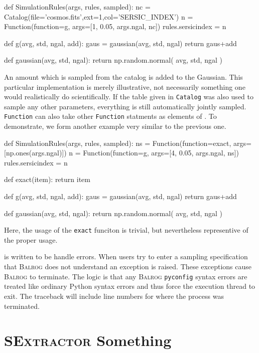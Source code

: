 \documentclass[12pt]{book}
\newcommand{\codett}[1]{\lstinline{#1}}
\newcommand{\py}{Python}
\newcommand{\pyconfig}{\codett{pyconfig}}
\newcommand{\balrog}{\textsc{Balrog}}
\newcommand{\sex}{\textsc{SExtractor}}
\begin{document}
\begin{code}
def SimulationRules(args, rules, sampled):
    nc = Catalog(file='cosmos.fits',ext=1,col='SERSIC_INDEX')
    n = Function(function=g, args=[1, 0.05, args.ngal, nc])
    rules.sersicindex = n

def g(avg, std, ngal, add):
    gaus = gaussian(avg, std, ngal)
    return gaus+add

def gaussian(avg, std, ngal):
    return np.random.normal( avg, std, ngal )
\end{code}

\noindent An amount which is sampled from the catalog is added to the Gaussian.
This particular implementation is merely illustrative, not necessarily
something one would realistically do scientifically.
If the table given in \codett{Catalog} was also used to sample any other parameters,
everything is still automatically jointly sampled.
\codett{Function} can also take other \codett{Function} statments as elements of \simargs{}.
To demonstrate, we form another example very similar to the previous one.

\begin{code}
def SimulationRules(args, rules, sampled):
    ns = Function(function=exact, args=[np.ones(args.ngal)])
    n = Function(function=g, args=[4, 0.05, args.ngal, ns])
    rules.sersicindex = n

def exact(item):
    return item

def g(avg, std, ngal, add):
    gaus = gaussian(avg, std, ngal)
    return gaus+add

def gaussian(avg, std, ngal):
    return np.random.normal( avg, std, ngal )
\end{code}

\noindent Here, the usage of the \codett{exact} funciton is trivial, but nevertheless
representive of the proper usage.

\simfunc{} is written to be handle errors.
When users try to enter a sampling specification that \balrog{} does not understand an exception is raised.
These exceptions cause \balrog{} to terminate.
The logic is that any \balrog{} \pyconfig{} syntax errors are treated like ordinary \py{} syntax
errors and thus force the execution thread to exit.
The traceback will include line numbers for where the process was terminated.


\section{\sex{} Something}
\label{sec:sexoverride}
\end{document}
